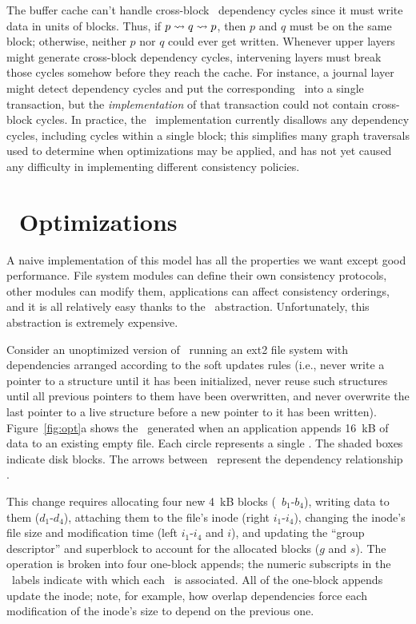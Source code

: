 The buffer cache can't handle cross-block \patch\ dependency cycles since
it must write data in units of blocks.
%
Thus, if $p \leadsto q \leadsto p$, then $p$ and $q$ must be on the same
block; otherwise, neither $p$ nor $q$ could ever get written.
%
Whenever upper layers might generate cross-block dependency cycles,
intervening layers must break those cycles somehow before they reach the
cache.
%
For instance, a journal layer might detect dependency cycles and put the
corresponding \patches\ into a single transaction, but the
\emph{implementation} of that transaction could not contain cross-block
cycles.
%
In practice, the \Kudos\ implementation currently disallows any dependency
cycles, including cycles within a single block; this simplifies many graph
traversals used to determine when optimizations may be applied, and has not
yet caused any difficulty in implementing different consistency policies.





\section{\Patch\ Optimizations}
\label{sec:patch:optimizations}

A naive implementation of this model has all the properties we want except
good performance.
%
File system modules can define their own consistency protocols, other
modules can modify them,
%
applications can affect consistency orderings, and it is all relatively
easy thanks to the \patch\ abstraction.
%
Unfortunately, this abstraction is extremely expensive.


Consider an unoptimized version of \Kudos\ running an ext2 file system with
dependencies arranged according to the soft updates rules (i.e., never write a
pointer to a structure until it has been initialized, never reuse such
structures until all previous pointers to them have been overwritten, and
never overwrite the last pointer to a live structure before a new pointer to
it has been written).
%
Figure~\ref{fig:opt}a shows the \patches\ generated when an application appends
16~kB of data to an existing empty file.
%
Each circle represents a single \patch. The shaded boxes indicate disk blocks.
%
The arrows between \patches\ represent the dependency relationship \PDDepend.

This change requires allocating four new 4~kB blocks (\patches\ $b_1$-$b_4$),
writing data to them ($d_1$-$d_4$), attaching them to the file's inode (right
$i_1$-$i_4$), changing the inode's file size and modification time (left
$i_1$-$i_4$ and $i$), and updating the ``group descriptor'' and superblock to
account for the allocated blocks ($g$ and $s$).
%
The operation is broken into four one-block appends; the numeric subscripts in
the \patch\ labels indicate with which each \patch\ is associated.
%
All of the one-block appends update the inode; note, for example, how overlap
dependencies force each modification of the inode's size to depend on the
previous one.

